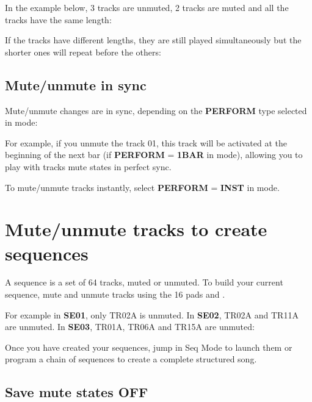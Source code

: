 In the example below, 3 tracks are unmuted, 2 tracks are muted and all the tracks have the same length:


If the tracks have different lengths, they are still played simultaneously but the shorter ones will repeat before the others:



\subsection{Mute/unmute in sync}

Mute/unmute changes are in sync, depending on the \textbf{PERFORM} type selected in  mode:


For example, if you unmute the track 01, this track will be activated at the beginning of the next bar (if \textbf{PERFORM} = \textbf{1BAR} in  mode), allowing you to play with tracks mute states in perfect sync.

To mute/unmute tracks instantly, select \textbf{PERFORM} = \textbf{INST} in  mode.



\section{Mute/unmute tracks to create sequences}

A sequence is a set of 64 tracks, muted or unmuted. To build your current sequence, mute and unmute tracks using the 16 pads \stepbystepicon{} and \btn{<} \btn{>}.

For example in \textbf{SE01}, only TR02A is unmuted. In \textbf{SE02}, TR02A and TR11A are unmuted. In \textbf{SE03}, TR01A, TR06A and TR15A are unmuted:


Once you have created your sequences, jump in Seq Mode to launch them or program a chain of sequences to create a complete structured song.

\subsection{Save mute states OFF}

